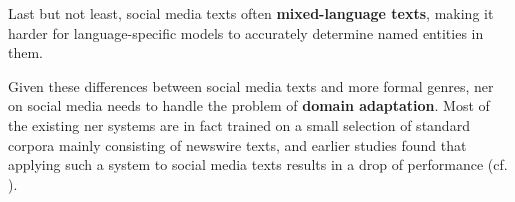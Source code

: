 Last but not least, social media texts often \textbf{mixed-language texts}, making it harder for language-specific models to accurately determine named entities in them.

Given these differences between social media texts and more formal genres, \gls{ner} on social media needs to handle the problem of \textbf{domain adaptation}. Most of the existing \gls{ner} systems are in fact trained on a small selection of standard corpora mainly consisting of newswire texts, and earlier studies found that applying such a system to social media texts results in a drop of performance (cf. \cite{ritter_2011}). 


